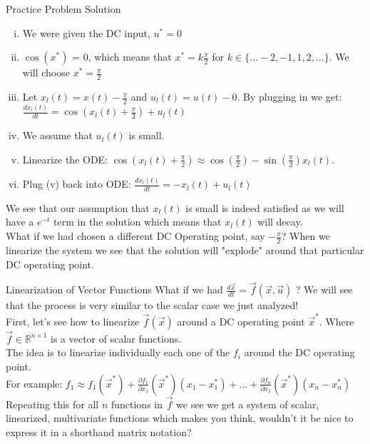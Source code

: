 \documentclass{beamer}
\newcommand{\R}{\mathbb{R}}
\begin{document}
\begin{frame}{Practice Problem Solution}
\begin{enumerate}[(i)]
\item We were given the DC input, $u^* = 0$ \pause \\
\item $\cos(x^*)$ = 0, which means that $x^* = k\frac{\pi}{2}$ for $k \in \{...-2,-1,1,2,...\}$. We will choose $x^* = \frac{\pi}{2}$ \pause \\
\item Let $x_l(t) = x(t) - \frac{\pi}{2}$ and $u_l(t) = u(t) - 0$.
By plugging in we get: $\frac{dx_l(t)}{dt} = \cos(x_l(t) + \frac{\pi}{2}) + u_l(t)$ \pause \\
\item We assume that $u_l(t)$ is small.\pause \\
\item Linearize the ODE: $\cos(x_l(t) + \frac{\pi}{2}) \approx \cos(\frac{\pi}{2}) -\sin(\frac{\pi}{2})x_l(t)$. \pause
\item Plug (v) back into ODE: 
$\frac{dx_l(t)}{dt} = -x_l(t) + u_l(t)$ 
\end{enumerate}
\pause 
We see that our assumption that  $x_l(t)$ is small is indeed satisfied as we will have a $e^{-t}$ term in the solution which means that $x_l(t)$ will decay.\\ \pause
What if we had chosen a different DC Operating point, say $-\frac{\pi}{2}$? When we linearize the system we see that the solution will "explode" around that particular DC operating point.
\end{frame}

\begin{frame}{Linearization of Vector Functions}
What if we had $\frac{d\vec{x}}{dt} = \vec{f}(\vec{x}, \vec{u})$ ? We will see that the process is very similar to the scalar case we just analyzed!\\ \pause
First, let's see how to linearize $\vec{f}(\vec{x})$ around a DC operating point $\vec{x}^*$. Where $\vec{f} \in \R^{n \times 1}$ is a vector of scalar functions. \\\pause
The idea is to linearize individually each one of the $f_i$ around the DC operating point. \\\pause
For example: $f_1 \approx f_1(\vec{x}^*) + \frac{\partial f_1}{\partial x_1}(\vec{x}^*)(x_1 - x_1^*) + ... +  \frac{\partial f_n}{\partial x_1}(\vec{x}^*)(x_n - x_n^*)$\\\pause
Repeating this for all $n$ functions in $\vec{f}$ we see we get a system of scalar, linearized, multivariate functions which makes you think, wouldn't it be nice to express it in a shorthand matrix notation?
\end{frame}
\end{document}
